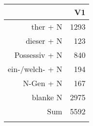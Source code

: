 \begin{tabular}{rr}
  \lsptoprule
 & V1 \\ 
  \midrule
ther + N & 1293 \\ 
  dieser + N & 123 \\ 
  Possessiv + N & 840 \\ 
  ein-/welch- + N & 194 \\ 
  N-Gen + N & 167 \\ 
  blanke N & 2975 \\ 
  Sum & 5592 \\ 
   \lspbottomrule
\end{tabular}
